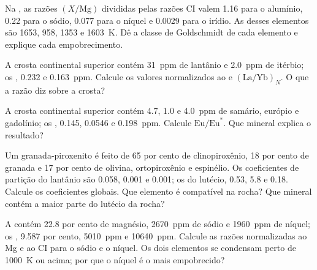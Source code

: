 \begin{exercise}[$\star$]\label{exo:b2:elements-in-the-earth:2}
Na , as razões $(X/\mathrm{Mg})$ divididas pelas razões CI
valem 1.16 para o alumínio, 0.22 para o sódio, 0.077 para o níquel e 0.0029 para o
irídio. As  desses elementos são 1653, 958, 1353
e \qty{1603}{K}. Dê a classe de Goldschmidt de cada elemento e explique cada
empobrecimento.
\end{exercise}

\begin{exercise}[$\star$]\label{exo:b2:elements-in-the-earth:3}
A crosta continental superior contém \qty{31}{ppm} de lantânio e \qty{2.0}{ppm}
de itérbio; os , 0.232 e \qty{0.163}{ppm}. Calcule os
valores normalizados ao  e $(\mathrm{La}/\mathrm{Yb})_N$. O que a
razão diz sobre a crosta?
\end{exercise}

\begin{exercise}[$\star$]\label{exo:b2:elements-in-the-earth:4}
A crosta continental superior contém 4.7, 1.0 e \qty{4.0}{ppm} de samário,
európio e gadolínio; os , 0.145, 0.0546 e \qty{0.198}{ppm}.
Calcule $\mathrm{Eu}/\mathrm{Eu}^*$. Que mineral explica o resultado?
\end{exercise}

\begin{exercise}[$\star\star$]\label{exo:b2:elements-in-the-earth:5}
Um granada-piroxenito é feito de 65 por cento de clinopiroxênio, 18 por cento de granada e
17 por cento de olivina, ortopiroxênio e espinélio. Os coeficientes de partição do
lantânio são 0.058, 0.001 e 0.001; os do lutécio, 0.53, 5.8 e 0.18.
Calcule os coeficientes globais. Que elemento é compatível na rocha? Que
mineral contém a maior parte do lutécio da rocha?
\end{exercise}

\begin{exercise}[$\star\star$]\label{exo:b2:elements-in-the-earth:6}
A  contém 22.8 por cento de magnésio, \qty{2670}{ppm} de
sódio e \qty{1960}{ppm} de níquel; os , 9.587 por cento,
\qty{5010}{ppm} e \qty{10640}{ppm}. Calcule as razões normalizadas ao Mg e ao CI para
o sódio e o níquel. Os dois elementos se condensam perto de \qty{1000}{K} ou acima; por que
o níquel é o mais empobrecido?
\end{exercise}

